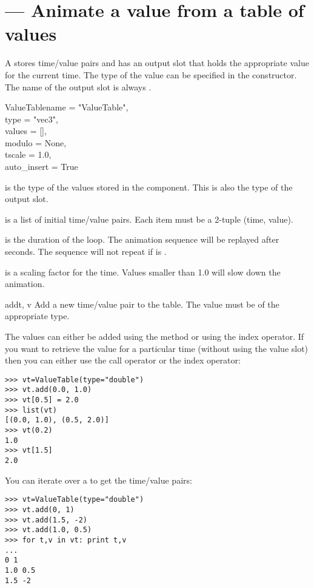 
\section{ ---
         Animate a value from a table of values}

A  stores time/value pairs and has an output slot that holds
the appropriate value for the current time. The type of the value can
be specified in the constructor. The name of the output slot is always
.

\begin{classdesc}{ValueTable}{name = "ValueTable",\\ 
	                      type = "vec3", \\
	                      values = [], \\
	                      modulo = None, \\
	                      tscale = 1.0, \\
                              auto_insert = True}

 is the type of the values stored in the component. This is also
the type of the output slot.

 is a list of initial time/value pairs. Each item must
be a 2-tuple (time, value).

 is the duration of the loop. The animation sequence will be
replayed after  seconds. The sequence will not repeat
if  is .

 is a scaling factor for the time. Values smaller than 1.0 will
slow down the animation.

\end{classdesc}

\begin{methoddesc}{add}{t, v}
Add a new time/value pair to the table. The value  must be of
the appropriate type.
\end{methoddesc}


The values can either be added using the  method or using
the index operator. If you want to retrieve the value for a particular
time (without using the value slot) then you can either use the call operator
or the index operator:

\begin{verbatim}
>>> vt=ValueTable(type="double")
>>> vt.add(0.0, 1.0)
>>> vt[0.5] = 2.0
>>> list(vt)
[(0.0, 1.0), (0.5, 2.0)]
>>> vt(0.2)
1.0
>>> vt[1.5]
2.0
\end{verbatim}

You can iterate over a  to get the time/value pairs:

\begin{verbatim}
>>> vt=ValueTable(type="double")
>>> vt.add(0, 1)
>>> vt.add(1.5, -2)
>>> vt.add(1.0, 0.5)
>>> for t,v in vt: print t,v
...
0 1
1.0 0.5
1.5 -2
\end{verbatim}
